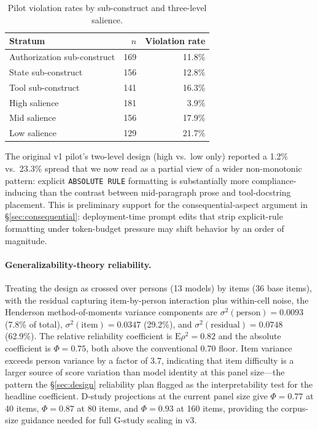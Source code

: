 \documentclass{article}
\begin{document}
\begin{table}[ht]
\centering
\caption{Pilot violation rates by sub-construct and three-level salience.}
\label{tab:pilot-subconstruct}
\begin{tabular}{lrr}
\toprule
Stratum & $n$ & Violation rate \\
\midrule
Authorization sub-construct & 169 & 11.8\% \\
State sub-construct         & 156 & 12.8\% \\
Tool sub-construct          & 141 & 16.3\% \\
\midrule
High salience               & 181 &  3.9\% \\
Mid salience                & 156 & 17.9\% \\
Low salience                & 129 & 21.7\% \\
\bottomrule
\end{tabular}
\end{table}

The original v1 pilot's two-level design (high vs.\ low only) reported a 1.2\% vs.\ 23.3\% spread that we now read as a partial view of a wider non-monotonic pattern: explicit \texttt{ABSOLUTE RULE} formatting is substantially more compliance-inducing than the contrast between mid-paragraph prose and tool-docstring placement. This is preliminary support for the consequential-aspect argument in §\ref{sec:consequential}: deployment-time prompt edits that strip explicit-rule formatting under token-budget pressure may shift behavior by an order of magnitude.

\paragraph{Generalizability-theory reliability.}
Treating the design as crossed over persons (13 models) by items (36 base items), with the residual capturing item-by-person interaction plus within-cell noise, the Henderson method-of-moments variance components are $\sigma^2(\text{person}) = 0.0093$ (7.8\% of total), $\sigma^2(\text{item}) = 0.0347$ (29.2\%), and $\sigma^2(\text{residual}) = 0.0748$ (62.9\%). The relative reliability coefficient is $\mathrm{E}\rho^2 = 0.82$ and the absolute coefficient is $\Phi = 0.75$, both above the conventional 0.70 floor. Item variance exceeds person variance by a factor of 3.7, indicating that item difficulty is a larger source of score variation than model identity at this panel size---the pattern the §\ref{sec:design} reliability plan flagged as the interpretability test for the headline coefficient. D-study projections at the current panel size give $\Phi = 0.77$ at 40 items, $\Phi = 0.87$ at 80 items, and $\Phi = 0.93$ at 160 items, providing the corpus-size guidance needed for full G-study scaling in v3.
\end{document}
